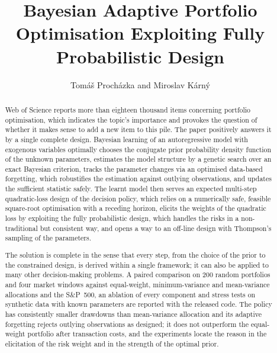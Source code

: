 \documentclass[final,3p,times,twocolumn]{elsarticle}
\newcommand{\bl}[1]{{\color{blue}#1}}                    %
\begin{document}
\title{Bayesian Adaptive Portfolio Optimisation Exploiting Fully Probabilistic Design}

\author[1]{Tom\'{a}\v{s} Proch\'{a}zka and Miroslav K\'{a}rn\'{y}}%

\begin{abstract} Web of Science reports more than eighteen thousand items concerning portfolio optimisation, which indicates the topic's importance and provokes the question of whether it makes sense to add a new item to this pile. The paper positively answers it by a single complete design. Bayesian learning of an autoregressive model with exogenous variables optimally chooses the conjugate prior probability density function of the unknown parameters, \bl{estimates the model structure by a genetic search over an exact Bayesian criterion}, tracks the parameter changes via an optimised data-based forgetting, which robustifies \bl{the estimation against outlying observations}, and updates the sufficient statistic safely. The learnt model then serves an expected multi-step quadratic-loss design of the decision policy, which relies on a numerically safe, feasible square-root optimisation with a receding horizon, elicits the weights of the quadratic loss by exploiting the fully probabilistic design, which handles the risks in a non-traditional but consistent way, and opens a way to an off-line design with Thompson's sampling of the parameters.

\bl{The solution is complete in the sense that every step, from the choice of the prior to the constrained design, is derived within a single framework;} it can also be applied to many other decision-making problems. \bl{A paired comparison on 200 random portfolios and four market windows against equal-weight, minimum-variance and mean-variance allocations and the S\&P~500, an ablation of every component and stress tests on synthetic data with known parameters are reported with the released code. The policy has consistently smaller drawdowns than mean-variance allocation and its adaptive forgetting rejects outlying observations as designed; it does not outperform the equal-weight portfolio after transaction costs, and the experiments locate the reason in the elicitation of the risk weight and in the strength of the optimal prior.}
\end{abstract}
\end{document}
